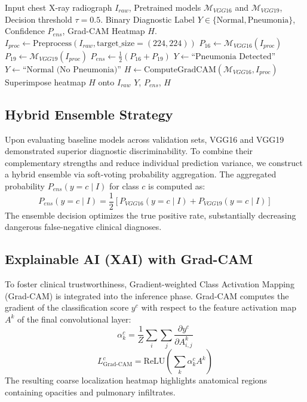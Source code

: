 \documentclass[conference]{IEEEtran}
\begin{document}
\begin{algorithm}[!t]
\caption{Proposed Hybrid Ensemble Diagnostic Pipeline}
\label{alg:hybrid_ensemble}
\begin{algorithmic}[1]
\REQUIRE Input chest X-ray radiograph $I_{raw}$, Pretrained models $\mathcal{M}_{VGG16}$ and $\mathcal{M}_{VGG19}$, Decision threshold $\tau = 0.5$.
\ENSURE Binary Diagnostic Label $Y \in \{\text{Normal}, \text{Pneumonia}\}$, Confidence $P_{ens}$, Grad-CAM Heatmap $H$.
\STATE $I_{proc} \leftarrow \text{Preprocess}(I_{raw}, \text{target\_size}=(224,224))$
\STATE $P_{16} \leftarrow \mathcal{M}_{VGG16}(I_{proc})$ 
\STATE $P_{19} \leftarrow \mathcal{M}_{VGG19}(I_{proc})$ 
\STATE $P_{ens} \leftarrow \frac{1}{2} \left( P_{16} + P_{19} \right)$ 
    \STATE $Y \leftarrow \text{``Pneumonia Detected''}$
\ELSE
    \STATE $Y \leftarrow \text{``Normal (No Pneumonia)''}$
\ENDIF
\STATE $H \leftarrow \text{ComputeGradCAM}(\mathcal{M}_{VGG16}, I_{proc})$
\STATE Superimpose heatmap $H$ onto $I_{raw}$
\RETURN $Y$, $P_{ens}$, $H$
\end{algorithmic}
\end{algorithm}

\subsection{Hybrid Ensemble Strategy}
Upon evaluating baseline models across validation sets, VGG16 and VGG19 demonstrated superior diagnostic discriminability. To combine their complementary strengths and reduce individual prediction variance, we construct a hybrid ensemble via soft-voting probability aggregation. The aggregated probability $P_{ens}(y=c \mid I)$ for class $c$ is computed as:
\begin{equation}
P_{ens}(y=c \mid I) = \frac{1}{2} \left[ P_{VGG16}(y=c \mid I) + P_{VGG19}(y=c \mid I) \right]
\end{equation}
The ensemble decision optimizes the true positive rate, substantially decreasing dangerous false-negative clinical diagnoses.

\subsection{Explainable AI (XAI) with Grad-CAM}
To foster clinical trustworthiness, Gradient-weighted Class Activation Mapping (Grad-CAM) is integrated into the inference phase. Grad-CAM computes the gradient of the classification score $y^c$ with respect to the feature activation map $A^k$ of the final convolutional layer:
\begin{equation}
\alpha_k^c = \frac{1}{Z} \sum_{i} \sum_{j} \frac{\partial y^c}{\partial A_{i,j}^k}
\end{equation}
\begin{equation}
L_{\text{Grad-CAM}}^c = \text{ReLU}\left( \sum_k \alpha_k^c A^k \right)
\end{equation}
The resulting coarse localization heatmap highlights anatomical regions containing opacities and pulmonary infiltrates.
\end{document}
